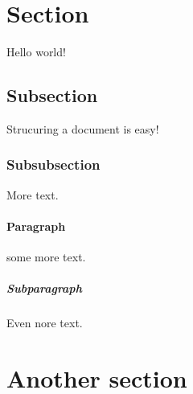 \documentclass{article}
\begin{document}
  \section{Section}
  Hello world!
  \subsection{Subsection}
  Strucuring a document is easy!
  \subsubsection{Subsubsection}
  More text.
  \paragraph{Paragraph}
  some more text.
  \subparagraph{Subparagraph}
  Even nore text.
  \section{Another section}
\end{document}
